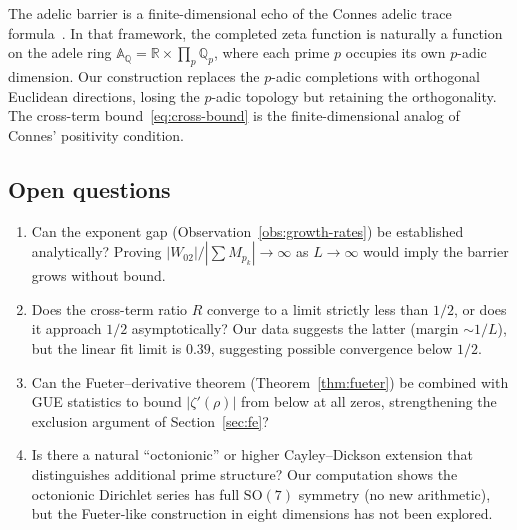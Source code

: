 \documentclass[11pt,a4paper]{article}
\theoremstyle{definition}
\begin{document}
The adelic barrier is a finite-dimensional echo of the Connes adelic trace formula~\cite{Connes1999}. In that framework, the completed zeta function is naturally a function on the adele ring $\mathbb{A}_\mathbb{Q} = \mathbb{R} \times \prod_p \mathbb{Q}_p$, where each prime $p$ occupies its own $p$-adic dimension. Our construction replaces the $p$-adic completions with orthogonal Euclidean directions, losing the $p$-adic topology but retaining the orthogonality. The cross-term bound~\eqref{eq:cross-bound} is the finite-dimensional analog of Connes' positivity condition.

\subsection{Open questions}

\begin{enumerate}
\item Can the exponent gap (Observation~\ref{obs:growth-rates}) be established analytically? Proving $|W_{02}| / |\sum M_{p_k}| \to \infty$ as $L \to \infty$ would imply the barrier grows without bound.
\item Does the cross-term ratio $R$ converge to a limit strictly less than $1/2$, or does it approach $1/2$ asymptotically? Our data suggests the latter (margin $\sim 1/L$), but the linear fit limit is $0.39$, suggesting possible convergence below $1/2$.
\item Can the Fueter--derivative theorem (Theorem~\ref{thm:fueter}) be combined with GUE statistics to bound $|\zeta'(\rho)|$ from below at all zeros, strengthening the exclusion argument of Section~\ref{sec:fe}?
\item Is there a natural ``octonionic'' or higher Cayley--Dickson extension that distinguishes additional prime structure? Our computation shows the octonionic Dirichlet series has full $\mathrm{SO}(7)$ symmetry (no new arithmetic), but the Fueter-like construction in eight dimensions has not been explored.
\end{enumerate}

\end{document}
